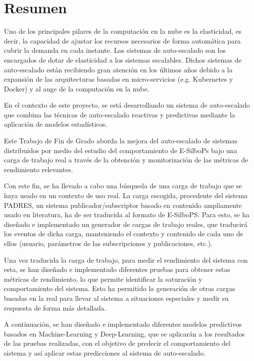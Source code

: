 \chapter*{Resumen} \label{chp:abstract}

Uno de los principales pilares de la computación en la nube es la elasticidad, 
es decir, la capacidad de ajustar los recursos necesarios de forma automática 
para cubrir la demanda en cada instante. Los sistemas de auto-escalado son los 
encargados de dotar de elasticidad a los sistemas escalables. 
Dichos sistemas de auto-escalado están recibiendo gran atención en los 
últimos años debido a la expansión de las arquitecturas basadas en
micro-servicios (e.g. Kubernetes y Docker) y al auge de la computación en la nube.

En el contexto de este proyecto, se está desarrollando un sistema de auto-escalado que combina las 
técnicas de auto-escalado reactivas y predictivas mediante la aplicación de 
modelos estadísticos.

Este Trabajo de Fin de Grado aborda la mejora del auto-escalado de sistemas 
distribuidos por medio del estudio del comportamiento de E-SilboPs bajo una carga
de trabajo real a través de la obtención y monitorización de las métricas de 
rendimiento relevantes.

Con este fin, se ha llevado a cabo una búsqueda de una carga de trabajo que se 
haya usado en un contexto de uso real. La carga escogida, procedente del sistema PADRES, un sistema 
publicador/subscriptor basado en contenido ampliamente usado en literatura, ha
de ser traducida al formato de E-SilboPS. Para esto, se ha diseñado e implementado
un generador de cargas de trabajo reales, que traducirá los eventos de dicha carga,
manteniendo el contexto y contenido de cada uno de ellos (usuario,
parámetros de las subscripciones y publicaciones, etc.).

Una vez traducida la carga de trabajo, para medir el rendimiento del sistema
con esta, se han diseñado e implementado diferentes pruebas para obtener estas
métricas de rendimiento, lo que permite identificar la saturación y comportamiento
del sistema. Esto ha permitido la generación de otras cargas basadas en la real para
llevar al sistema a situaciones especiales y medir su respuesta de forma más
detallada.

A continuación, se han diseñado e implementado diferentes modelos predictivos basados
en Machine-Learning y Deep-Learning, que se aplicarán a los resultados de las pruebas
realizadas, con el objetivo de predecir el comportamiento del sistema y así
aplicar estas predicciones al sistema de auto-escalado.

